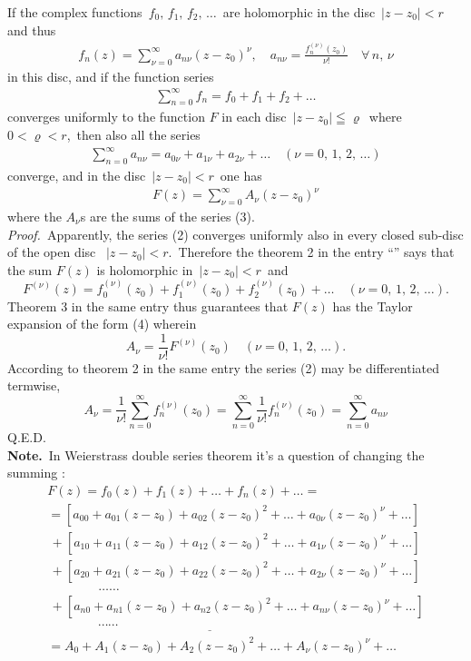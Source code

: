 \documentclass[12pt]{article}
\theoremstyle{definition}
\begin{document}
If the complex functions\, $f_0,\,f_1,\,f_2,\,\ldots$\, are holomorphic in the disc\, $\vert z-z_0\vert < r$\, and thus
\begin{align}
  f_n(z) = \sum_{\nu=0}^\infty a_{n\nu}(z-z_0)^\nu, \quad a_{n\nu} = \frac{f_n^{(\nu)}(z_0)}{\nu!}\quad \forall\,n,\,\nu
\end{align}
in this disc, and if the function series
\begin{align}
 \sum_{n=0}^\infty f_n = f_0+f_1+f_2+\ldots
\end{align}
converges uniformly to the function $F$ in each disc\, $|z-z_0| \leqq \varrho$\, where\, $0 < \varrho < r$,\, then also all the series 
\begin{align}
 \sum_{n=0}^\infty a_{n\nu} = a_{0\nu}+a_{1\nu}+a_{2\nu}+\ldots \quad 
(\nu = 0,\,1,\,2,\,\ldots)
\end{align}
converge, and in the disc\, $|z-z_0| < r$\, one has
\begin{align}
 F(z) = \sum_{\nu=0}^\infty A_\nu(z-z_0)^\nu
\end{align}
where the $A_\nu$s are the sums of the series (3).\\

{\em Proof.}\, Apparently, the series (2) converges uniformly also in every closed sub-disc of the open disc \, $|z-z_0| < r$.\, Therefore the theorem 2 in the entry ``'' says that the sum $F(z)$ is holomorphic in\, $|z-z_0| < r$\, and
$$F^{(\nu)}(z) = f_0^{(\nu)}(z_0)+f_1^{(\nu)}(z_0)+f_2^{(\nu)}(z_0)+\ldots
\quad (\nu = 0,\,1,\,2,\,\ldots).$$
Theorem 3 in the same entry thus guarantees that $F(z)$ has the Taylor expansion of the form (4) wherein
$$A_\nu = \frac{1}{\nu!}F^{(\nu)}(z_0) \quad (\nu = 0,\,1,\,2,\,\ldots).$$
According to theorem 2 in the same entry the series (2) may be differentiated termwise,
$$A_\nu = \frac{1}{\nu!}\sum_{n=0}^\infty f_n^{(\nu)}(z_0) = 
\sum_{n=0}^\infty \frac{1}{\nu!}f_n^{(\nu)}(z_0) = \sum_{n=0}^\infty a_{n\nu}$$
Q.E.D.\\

\textbf{Note.}\, In Weierstrass double series theorem it's a question of changing the summing :
$$
\begin{array}{l}
F(z) = f_0(z)+f_1(z)+\ldots+f_n(z)+\ldots =\\
= [a_{00}+a_{01}(z-z_0)+a_{02}(z-z_0)^2+\ldots+a_{0\nu}(z-z_0)^\nu+\ldots]\\
\,+[a_{10}+a_{11}(z-z_0)+a_{12}(z-z_0)^2+\ldots+a_{1\nu}(z-z_0)^\nu+\ldots]\\
\,+[a_{20}+a_{21}(z-z_0)+a_{22}(z-z_0)^2+\ldots+a_{2\nu}(z-z_0)^\nu+\ldots]\\
\qquad \qquad \ldots\ldots\\
\,+[a_{n0}+a_{n1}(z-z_0)+a_{n2}(z-z_0)^2+\ldots+a_{n\nu}(z-z_0)^\nu+\ldots]\\
\underline{\qquad\qquad\cdots\cdots\qquad\qquad\qquad\qquad\qquad\qquad\qquad\qquad\qquad\qquad}\\
= A_0+A_1(z-z_0)+A_2(z-z_0)^2+\ldots+A_\nu(z-z_0)^\nu+\ldots
\end{array}
$$



\end{document}
